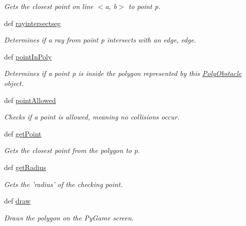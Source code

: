 \begin{DoxyCompactItemize}
\begin{DoxyCompactList}\small\item\em Gets the closest point on line $<$a, b$>$ to point p. \end{DoxyCompactList}\item 
def \hyperlink{classobstacle_1_1PolyObstacle_a646f5fc4ba3e67c98c2313f4493b6a08}{rayintersectseg}
\begin{DoxyCompactList}\small\item\em Determines if a ray from point p intersects with an edge, edge. \end{DoxyCompactList}\item 
def \hyperlink{classobstacle_1_1PolyObstacle_a4647d9efa8fb20d7b464ee5faa8fd7f4}{point\-In\-Poly}
\begin{DoxyCompactList}\small\item\em Determines if a point p is inside the polygon represented by this \hyperlink{classobstacle_1_1PolyObstacle}{Poly\-Obstacle} object. \end{DoxyCompactList}\item 
def \hyperlink{classobstacle_1_1PolyObstacle_af71f01fca50193a5e5372c2507661ada}{point\-Allowed}
\begin{DoxyCompactList}\small\item\em Checks if a point is allowed, meaning no collisions occur. \end{DoxyCompactList}\item 
def \hyperlink{classobstacle_1_1PolyObstacle_af866b6f101194b8a8731f2394fdc247e}{get\-Point}
\begin{DoxyCompactList}\small\item\em Gets the closest point from the polygon to p. \end{DoxyCompactList}\item 
def \hyperlink{classobstacle_1_1PolyObstacle_a205face22efbad01fd4c96fbe73321fd}{get\-Radius}
\begin{DoxyCompactList}\small\item\em Gets the 'radius' of the checking point. \end{DoxyCompactList}\item 
def \hyperlink{classobstacle_1_1PolyObstacle_a9b5b53a6b8ee6233de2ee394871ebe6e}{draw}
\begin{DoxyCompactList}\small\item\em Draws the polygon on the Py\-Game screen. \end{DoxyCompactList}\end{DoxyCompactItemize}

